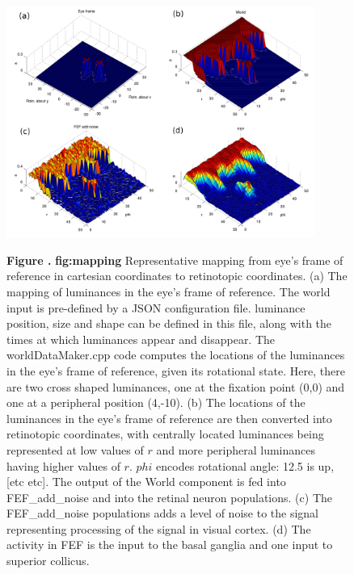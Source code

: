\documentclass{frontiersSCNS}
\begin{document}
\begin{figure}[htb!]
\begin{center}
\includegraphics[width=0.9\textwidth]{./figures/mapping.png}
\end{center}
\textbf{\label{fig:mapping} Figure .}
{ \textbf{fig:mapping} Representative mapping from eye's frame of reference in cartesian
coordinates to retinotopic coordinates. (a) The mapping of luminances
in the eye's frame of reference. The world input is pre-defined by a
JSON configuration file. luminance position, size and shape can be
defined in this file, along with the times at which luminances appear
and disappear. The worldDataMaker.cpp code computes the locations of
the luminances in the eye's frame of reference, given its rotational
state. Here, there are two cross shaped luminances, one at the
fixation point (0,0) and one at a peripheral position (4,-10). (b) The
locations of the luminances in the eye's frame of reference are then
converted into retinotopic coordinates, with centrally located
luminances being represented at low values of $r$ and more peripheral
luminances having higher values of $r$. $phi$ encodes rotational
angle: 12.5 is up, [etc etc]. The output of the World component is fed
into FEF\_add\_noise and into the retinal neuron populations. (c) The
FEF\_add\_noise populations adds a level of noise to the signal
representing processing of the signal in visual cortex. (d) The
activity in FEF is the input to the basal ganglia and one input to
superior collicus.}
\end{figure}
\end{document}
